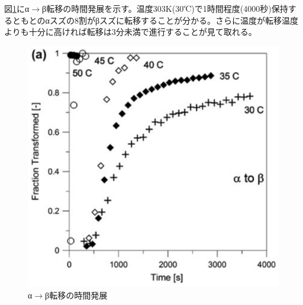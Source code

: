図\ref{fig:alpha-to-beta}にα$\to$β転移の時間発展を示す\cite{Nogita}。温度303K(30℃)で1時間程度(4000秒)保持するともとのαスズの8割がβスズに転移することが分かる。さらに温度が転移温度よりも十分に高ければ転移は3分未満で進行することが見て取れる。
\begin{figure}[!h]
  \begin{center}
   \includegraphics[width=0.5\hsize]{Introduction/alpha-to-beta.eps}
  \end{center}
  \caption{α$\to$β転移の時間発展}
  \label{fig:alpha-to-beta}
  \end{figure}

